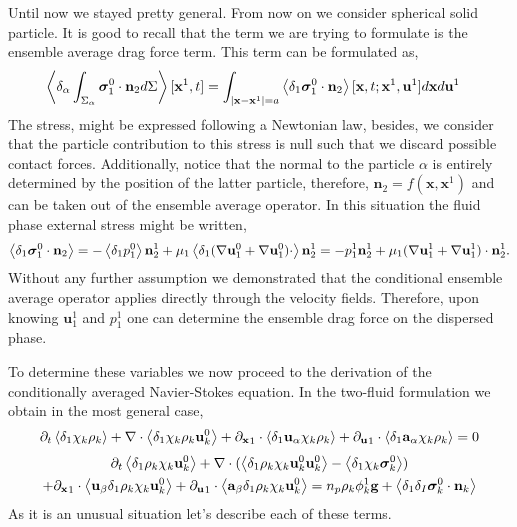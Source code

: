 Until now we stayed pretty general. 
From now on we consider spherical solid particle.
It is good to recall that the term we are trying to formulate is the ensemble average  drag force term. 
This term can be formulated as, 
\begin{align}
    \left<\delta_\alpha \int_{\Sigma_\alpha} \bm\sigma_1^0\cdot\textbf{n}_2 d\Sigma\right>[\textbf{x}^1,t]
    &=
    \int_{|\textbf{x}-\textbf{x}^1|=a}
    \left<\delta_1  \bm\sigma_1^0\cdot \textbf{n}_2\right>
    [\textbf{x},t;\textbf{x}^1,\textbf{u}^1]
    d\textbf{x}
    d\textbf{u}^1
\end{align}
The stress, might be expressed following a Newtonian law, besides, we consider that the particle contribution to this stress is null such that we discard possible contact forces. 
Additionally, notice that the normal to the particle $\alpha$ is entirely determined by the position of the latter particle, therefore, $\textbf{n}_2 = f(\textbf{x},\textbf{x}^1)$ and can be taken out of the ensemble average operator. 
In this situation the fluid phase external stress might be written, 
\begin{equation*}
    \left<\delta_1  \bm\sigma_1^0\cdot \textbf{n}_2\right>
    = 
    - \left<\delta_1  p_1^0 \right>\textbf{n}_2^1
    + \mu_1 \left<\delta_1  (\mathbf{\nabla} \textbf{u}_1^0 + \mathbf{\nabla} \textbf{u}_1^0)\cdot \right>\textbf{n}_2^1
    = 
    -   p_1^1 \textbf{n}_2^1
    + \mu_1  (\mathbf{\nabla} \textbf{u}_1^1 + \mathbf{\nabla} \textbf{u}_1^1) \cdot \textbf{n}_2^1. 
\end{equation*}
Without any further assumption we demonstrated that the conditional ensemble average operator applies directly through the velocity fields. 
Therefore, upon knowing $\textbf{u}_1^1$ and $p_1^1$ one can determine the ensemble drag force on the dispersed phase. 







To determine these variables we now proceed to the derivation of the conditionally averaged Navier-Stokes equation. 
In the two-fluid formulation we obtain in the most general case, 
\begin{equation}
    \partial_t \left<\delta_1 \chi_k \rho_k\right>
    +  \mathbf{\nabla}\cdot \left<\delta_1 \chi_k \rho_k \textbf{u}_k^0\right>
    +  {\partial_\textbf{x}}_1 \cdot
    \left<\delta_1 \textbf{u}_\alpha \chi_k \rho_k\right>
    +  {\partial_\textbf{u}}_1 \cdot
    \left<\delta_1  \textbf{a}_\alpha \chi_k \rho_k\right>
    = 0
\end{equation}
\begin{multline}
    \partial_t \left<\delta_1 \rho_k \chi_k \textbf{u}_k^0 \right>
    + \mathbf{\nabla}\cdot(
        \left<\delta_1 \rho_k \chi_k \textbf{u}_k^0 \textbf{u}^0_k  \right>
    - \left<\delta_1\chi_k\bm\sigma^0_k\right>)\\
    + {\partial_\textbf{x}}_1 \cdot
        \left<\textbf{u}_\beta\delta_1 \rho_k \chi_k \textbf{u}_k^0 \right>
    + {\partial_\textbf{u}}_1 \cdot
        \left<\textbf{a}_\beta\delta_1 \rho_k \chi_k \textbf{u}_k^0 \right>
    = n_p  \rho_k \phi_k^1 \textbf{g} 
    + \left<\delta_1\delta_I \bm\sigma_k^0 \cdot \textbf{n}_k\right>
\end{multline}
As it is an unusual situation let's describe each of these terms. 


